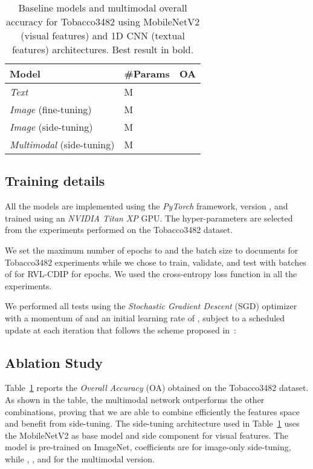 \begin{table}[t]
    \caption{Baseline models and multimodal overall accuracy for Tobacco3482 using MobileNetV2 (visual features) and 1D CNN (textual features) architectures. Best result in bold.}\label{tab:exp_baseline}
    \centering
    \begin{tabular}{llc}
        \toprule
        \bfseries Model & \bfseries \#Params & \bfseries OA \\ 
        \midrule
        \textit{Text} & M &  \\
        \textit{Image} ({\scriptsize fine-tuning}) & M &  \\    
        \textit{Image} ({\scriptsize side-tuning}) & M &  \\
        \midrule
        \textit{Multimodal} ({\scriptsize side-tuning}) & M &  \\
        \bottomrule
    \end{tabular}
\end{table}

\subsection{Training details}\label{subsec:exp_details}
All the models are implemented using the \textit{PyTorch} framework, version , and trained using an \textit{NVIDIA Titan XP} GPU\@. 
The hyper-parameters are selected from the experiments performed on the Tobacco3482 dataset.

We set the maximum number of epochs to  and the batch size to  documents for Tobacco3482 experiments while we chose to train, validate, and test with batches of  for RVL-CDIP for  epochs. 
We used the cross-entropy loss function in all the experiments.

We performed all tests using the \textit{Stochastic Gradient Descent} (SGD) optimizer with a momentum of  and an initial learning rate of , subject to a scheduled update at each iteration that follows the scheme proposed in~\cite{8270080}:


\subsection{Ablation Study}\label{subsec:exp_ablation}
Table~\ref{tab:exp_baseline} reports the \textit{Overall Accuracy} (OA) obtained on the Tobacco3482 dataset.
As shown in the table, the multimodal network outperforms the other combinations, proving that we are able to combine efficiently the features space and benefit from side-tuning.
The side-tuning architecture used in Table~\ref{tab:exp_baseline} uses the MobileNetV2 as base model and side component for visual features. 
The model is pre-trained on ImageNet, coefficients are  for image-only side-tuning, while , , and  for the multimodal version.


